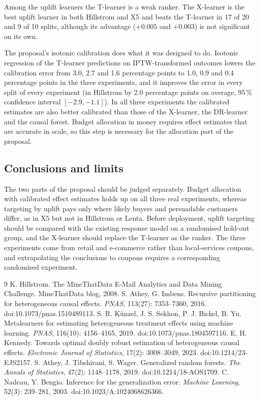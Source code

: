 Among the uplift learners the T-learner is a weak ranker. The X-learner is the best uplift learner in both Hillstrom and X5 and beats the T-learner in 17 of 20 and 9 of 10 splits, although its advantage ($+0.005$ and $+0.003$) is not significant on its own.

The proposal's isotonic calibration does what it was designed to do. Isotonic regression of the T-learner predictions on IPTW-transformed outcomes lowers the calibration error from 3.0, 2.7 and 1.6 percentage points to 1.0, 0.9 and 0.4 percentage points in the three experiments, and it improves the error in every split of every experiment (in Hillstrom by 2.0 percentage points on average, 95\,\% confidence interval $[-2.9, -1.1]$). In all three experiments the calibrated estimates are also better calibrated than those of the X-learner, the DR-learner and the causal forest. Budget allocation in money requires effect estimates that are accurate in scale, so this step is necessary for the allocation part of the proposal.

\subsection{Conclusions and limits}
The two parts of the proposal should be judged separately. Budget allocation with calibrated effect estimates holds up on all three real experiments, whereas targeting by uplift pays only where likely buyers and persuadable customers differ, as in X5 but not in Hillstrom or Lenta. Before deployment, uplift targeting should be compared with the existing response model on a randomised hold-out group, and the X-learner should replace the T-learner as the ranker. The three experiments come from retail and e-commerce rather than local-services coupons, and extrapolating the conclusions to coupons requires a corresponding randomised experiment.

\begin{thebibliography}{9}
 K. Hillstrom. The MineThatData E-Mail Analytics and Data Mining Challenge. MineThatData blog, 2008.
 S. Athey, G. Imbens. Recursive partitioning for heterogeneous causal effects. \emph{PNAS}, 113(27): 7353--7360, 2016. doi:10.1073/pnas.1510489113.
 S. R. K\"unzel, J. S. Sekhon, P. J. Bickel, B. Yu. Metalearners for estimating heterogeneous treatment effects using machine learning. \emph{PNAS}, 116(10): 4156--4165, 2019. doi:10.1073/pnas.1804597116.
 E. H. Kennedy. Towards optimal doubly robust estimation of heterogeneous causal effects. \emph{Electronic Journal of Statistics}, 17(2): 3008--3049, 2023. doi:10.1214/23-EJS2157.
 S. Athey, J. Tibshirani, S. Wager. Generalized random forests. \emph{The Annals of Statistics}, 47(2): 1148--1178, 2019. doi:10.1214/18-AOS1709.
 C. Nadeau, Y. Bengio. Inference for the generalization error. \emph{Machine Learning}, 52(3): 239--281, 2003. doi:10.1023/A:1024068626366.
\end{thebibliography}

